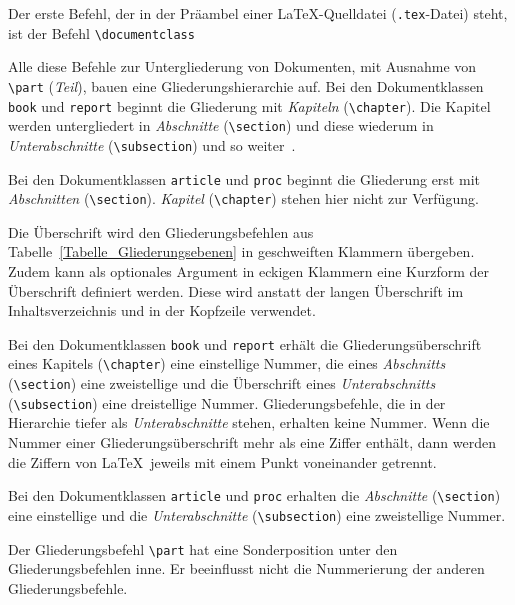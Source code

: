 Der erste Befehl, der in der Präambel einer \LaTeX-Quelldatei (\verb!.tex!-Datei) steht, ist der Befehl \verb!\documentclass!
\begin{document}
Alle diese Befehle zur Untergliederung
von Dokumenten, mit
Ausnahme von
\texttt{\textbackslash part} (\textsl{Teil}), bauen eine
Gliederungshierarchie auf.
Bei den Dokumentklassen 
\verb!book! und
\verb!report! beginnt die 
Gliederung mit
\textsl{Kapiteln} (\texttt{\textbackslash chapter}). Die
Kapitel werden untergliedert in
\textsl{Abschnitte} (\texttt{\textbackslash section})
und diese wiederum in 
\textsl{Unterabschnitte} (\texttt{\textbackslash subsection}) 
und so weiter~\cite{Kopka2000}. 

Bei den 
Dokumentklassen \verb!article! und \verb!proc! 
beginnt die Gliederung erst mit 
\textsl{Abschnitten} (\texttt{\textbackslash section}). 
\textsl{Kapitel} (\texttt{\textbackslash chapter}) stehen hier 
nicht zur Verfügung. 

Die Überschrift wird den Gliederungsbefehlen aus Tabelle~\ref{Tabelle_Gliederungsebenen}  in geschweiften Klammern übergeben. Zudem kann als optionales Argument in eckigen Klammern eine Kurzform der Überschrift definiert werden. Diese wird anstatt der langen Überschrift im Inhaltsverzeichnis und in der Kopfzeile verwendet.



Bei den Dokumentklassen \verb!book! 
und \verb!report! erhält die
Gliederungsüberschrift eines Kapitels 
(\texttt{\textbackslash chapter}) eine einstellige 
Nummer, die eines \textsl{Abschnitts} 
(\texttt{\textbackslash section}) eine zweistellige 
und die Überschrift eines \textsl{Unterabschnitts} 
(\texttt{\textbackslash subsection}) eine dreistellige Nummer. 
Gliederungsbefehle, die in der Hierarchie 
tiefer als \textsl{Unterabschnitte} stehen, 
erhalten keine Nummer. Wenn die Nummer einer 
Gliederungsüberschrift mehr als eine Ziffer 
enthält, dann werden die Ziffern von \LaTeX\ jeweils mit 
einem Punkt voneinander getrennt.

Bei den Dokumentklassen \verb!article! 
und \verb!proc! erhalten die 
\textsl{Abschnitte} (\texttt{\textbackslash section})
eine einstellige und die 
\textsl{Unterabschnitte} (\texttt{\textbackslash subsection}) 
eine zweistellige Nummer.

Der Gliederungsbefehl \texttt{\textbackslash part} hat eine Sonderposition 
unter den Gliederungsbefehlen inne. Er beeinflusst nicht die Nummerierung 
der anderen Gliederungsbefehle.
\end{document}
